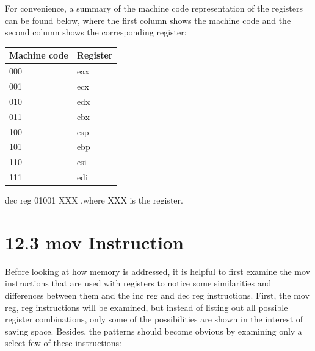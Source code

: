 \documentclass[10pt]{article}
\begin{document}
For convenience, a summary of the machine code representation of the registers can be found below, where the first column shows the machine code and the second column shows the corresponding register:

\begin{center}
\begin{tabular}{|l|l|}
\hline
Machine code & Register \\
\hline
000 & eax \\
\hline
001 & ecx \\
\hline
010 & edx \\
\hline
011 & ebx \\
\hline
100 & esp \\
\hline
101 & ebp \\
\hline
110 & esi \\
\hline
111 & edi \\
\hline
\end{tabular}
\end{center}

\begin{table}[h]
\begin{center}
dec reg 01001 XXX ,where XXX is the register.
\captionsetup{labelformat=empty}
\caption{Fig. 12.3 Format for the dec instruction}
\end{center}
\end{table}

\section*{$\mathbf{1 2 . 3}$ mov Instruction}
Before looking at how memory is addressed, it is helpful to first examine the mov instructions that are used with registers to notice some similarities and differences between them and the inc reg and dec reg instructions. First, the mov reg, reg instructions will be examined, but instead of listing out all possible register combinations, only some of the possibilities are shown in the interest of saving space. Besides, the patterns should become obvious by examining only a select few of these instructions:
\end{document}
